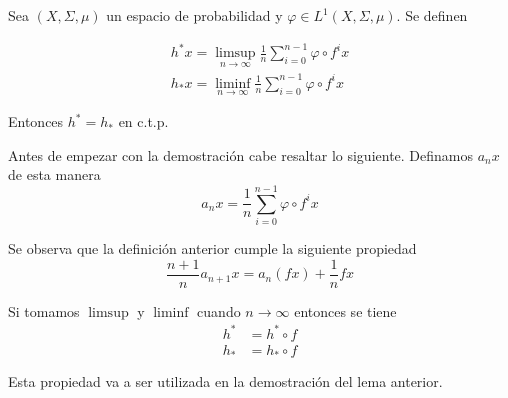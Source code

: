 \begin{lema}\label{birkhoff_lema1}
	Sea $(X,\Sigma,\mu)$ un espacio de probabilidad y $\varphi \in L^1(X,\Sigma,\mu)$. Se definen
	
	\begin{gather}
		h^* x = \limsup_{n \rightarrow \infty} \frac{1}{n} \sum_{i=0}^{n-1} \varphi \circ f^i x\\
		h_* x = \liminf_{n \rightarrow \infty} \frac{1}{n} \sum_{i=0}^{n-1} \varphi \circ f^i x
	\end{gather}
	
	Entonces $h^* = h_*$ en c.t.p.
	
\end{lema}

Antes de empezar con la demostración cabe resaltar lo siguiente. Definamos $a_n x$ de esta manera
\begin{equation}
a_n x = \frac{1}{n} \sum_{i=0}^{n-1} \varphi \circ f^i x
\end{equation}

Se observa que la definición anterior cumple la siguiente propiedad
\begin{equation}
\frac{n+1}{n} a_{n+1} x = a_n (fx) + \frac{1}{n} f x
\end{equation}

Si tomamos $\limsup$ y $\liminf$ cuando $n \rightarrow \infty$ entonces se tiene
\begin{align}
h^* &= h^* \circ f\\
h_* &= h_* \circ f
\end{align}

Esta propiedad va a ser utilizada en la demostración del lema anterior.

